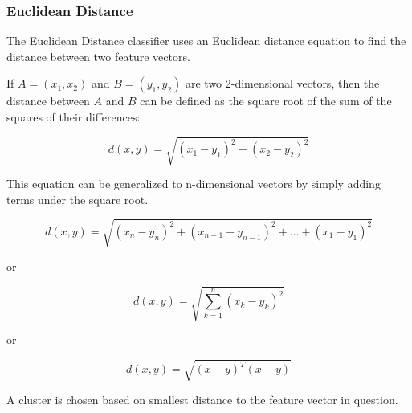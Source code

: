 \subsubsection{Euclidean Distance}

The Euclidean Distance classifier uses an Euclidean distance equation to find the
distance between two feature vectors.

If $A=(x_{1},x_{2})$ and $B=(y_{1},y_{2})$ are two 2-dimensional vectors, then the distance between
$A$ and $B$ can be defined as the square root of the sum of the squares of their
differences:

$$ d(x,y) = \sqrt{(x_{1}-y_{1})^{2} + {(x_{2}-y_{2})}^{2}} $$

This equation can be generalized to n-dimensional vectors by simply adding terms
under the square root.

$$ d(x,y) = \sqrt{(x_{n}-y_{n})^{2} + {(x_{n-1}-y_{n-1})}^{2} + ... + {(x_{1}-y_{1})}^{2}} $$

or

$$ d(x,y) = \sqrt{\displaystyle\sum_{k=1}^{n}(x_{k}-y_{k})^{2}} $$

or

$$ d(x,y) = \sqrt{(x-y)^{T}(x-y)} $$


A cluster is chosen based on smallest distance to the feature vector in question.
